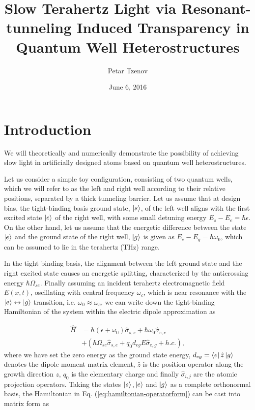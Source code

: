 \documentclass[twocolumn,secnumarabic,amssymb, nobibnotes, aps, prd]{revtex4-1}
\def\h{\hat}
\begin{document}
\title{Slow Terahertz Light via Resonant-tunneling Induced Transparency in Quantum Well Heterostructures}%

\author{Petar Tzenov}%
\date{June 6, 2016}%
\maketitle
\tableofcontents

\section{Introduction}
We will theoretically and numerically demonstrate the possibility of achieving slow light in artificially designed atoms based on quantum well heterostructures.

Let us consider a simple toy configuration, consisting of two quantum wells, which we will refer to as the left and right well according to their relative positions, separated by a thick tunneling barrier. Let us assume that 
at design bias, the tight-binding basis ground state, $\Ket{s}$, of the left well aligns with  the first excited state $\Ket{e}$ of the right well, with some small detuning energy $E_{s}-E_{e} = \hbar \epsilon$. On the other hand, let us assume that the energetic difference between the state $\Ket{e}$ and the ground state of the right well, $\Ket{g}$ is given as $E_{e}- E_{g} = \hbar\omega_0 $, which can be assumed to lie in the terahertz (THz) range. 

In the tight binding basis, the alignment between the left ground state and the right excited state causes an energetic splitting, characterized by the anticrossing energy $\hbar\Omega_{se}$. Finally assuming an incident terahertz electromagnetic field $E(x,t)$, oscillating with central frequency $\omega_c$, which is near resonance with the $\Ket{e}\leftrightarrow\Ket{g}$ transition, i.e. $\omega_0 \approx \omega_c$, we can write down the tight-binding Hamiltonian of the system within the electric dipole approximation as

\begin{align}
	\label{eq:hamiltonian-operatorform}
	\h{H} &= \hbar(\epsilon + \omega_0) \h\sigma_{s,s} +\hbar\omega_0\h\sigma_{e,e}  \nonumber \\ 
	& +(\hbar\Omega_{se}\h\sigma_{s,e} +q_0d_{eg}E\h\sigma_{e,g}+h.c.),
\end{align}
where we have set the zero energy as the ground state energy, $d_{eg}=\Bra{e}\h z \Ket{g}$  denotes the dipole moment matrix element, $\h z$ is the position operator along the growth direction $z$, $q_0$ is the elementary charge and finally $\h \sigma_{i,j}$ are the atomic projection operators. Taking the states $\Ket{s},\Ket{e}$ and $\Ket{g}$ as a complete orthonormal basis,  the Hamiltonian in Eq. (\ref{eq:hamiltonian-operatorform}) can be cast into matrix form as
\end{document}
